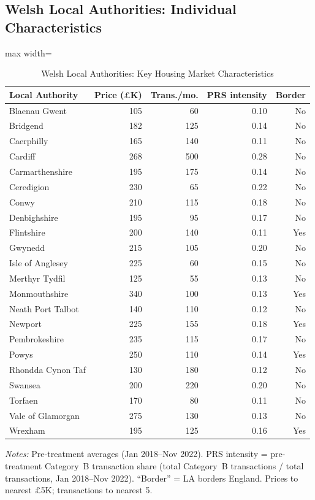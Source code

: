 \documentclass[12pt]{article}
\begin{document}
\subsection{Welsh Local Authorities: Individual Characteristics}

\begin{table}[H]
\centering
\caption{Welsh Local Authorities: Key Housing Market Characteristics}
\label{tab:welsh_las}
\begin{adjustbox}{max width=\textwidth}
\begin{tabular}{lrrrr}
\toprule
Local Authority & Price ($\pounds$K) & Trans./mo. & PRS intensity & Border \\
\midrule
Blaenau Gwent & 105 & 60 & 0.10 & No \\
Bridgend & 182 & 125 & 0.14 & No \\
Caerphilly & 165 & 140 & 0.11 & No \\
Cardiff & 268 & 500 & 0.28 & No \\
Carmarthenshire & 195 & 175 & 0.14 & No \\
Ceredigion & 230 & 65 & 0.22 & No \\
Conwy & 210 & 115 & 0.18 & No \\
Denbighshire & 195 & 95 & 0.17 & No \\
Flintshire & 200 & 140 & 0.11 & Yes \\
Gwynedd & 215 & 105 & 0.20 & No \\
Isle of Anglesey & 225 & 60 & 0.15 & No \\
Merthyr Tydfil & 125 & 55 & 0.13 & No \\
Monmouthshire & 340 & 100 & 0.13 & Yes \\
Neath Port Talbot & 140 & 110 & 0.12 & No \\
Newport & 225 & 155 & 0.18 & Yes \\
Pembrokeshire & 235 & 115 & 0.17 & No \\
Powys & 250 & 110 & 0.14 & Yes \\
Rhondda Cynon Taf & 130 & 180 & 0.12 & No \\
Swansea & 200 & 220 & 0.20 & No \\
Torfaen & 170 & 80 & 0.11 & No \\
Vale of Glamorgan & 275 & 130 & 0.13 & No \\
Wrexham & 195 & 125 & 0.16 & Yes \\
\bottomrule
\end{tabular}
\end{adjustbox}
\par\vspace{0.3em}
{\footnotesize \textit{Notes:} Pre-treatment averages (Jan 2018--Nov 2022).
PRS intensity = pre-treatment Category~B transaction share (total Category~B transactions / total transactions, Jan 2018--Nov 2022).
``Border'' = LA borders England.
Prices to nearest $\pounds$5K; transactions to nearest 5.}
\end{table}
\end{document}

